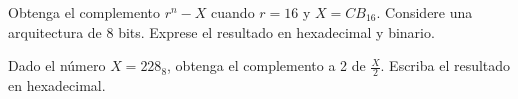 \documentclass[addpoints]{exam}
\begin{document}
\begin{questions}

  

\question Obtenga el complemento $r^n-X$ cuando $r=16$ y
  $X=CB_{16}$. Considere una arquitectura de 8 bits. Exprese el
  resultado en hexadecimal y binario.


  

\droptotalpoints %

\question[1 \half] Dado el número $X=228_8$, obtenga el complemento a 2 de
  $\frac{X}{2}$. Escriba el resultado en hexadecimal.


\droptotalpoints


\end{questions}
\end{document}
